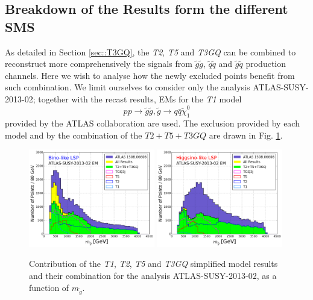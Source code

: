 \documentclass[a4paper,10pt]{article}
\newcommand{\MGLU}{$ m _{ \tilde g } $\xspace}
\begin{document}
\subsection{Breakdown of the Results form the different SMS}
As detailed in Section \ref{sec::T3GQ}, the \textit{T2}, \textit{T5} and \textit{T3GQ} can be combined to reconstruct more comprehensively the signals from $\tilde g \tilde g$, $\tilde q \tilde q$ and $\tilde g \tilde q$ production channels. Here we wish to analyse how the newly excluded points benefit from such combination. We limit ourselves to consider only the analysis ATLAS-SUSY-2013-02; together with the recast results, EMs for the \textit{T1} model 
\begin{equation}
p p \rightarrow \tilde g \tilde g , \tilde g \rightarrow q \bar q \tilde \chi_1 ^0
\end{equation}
provided by the ATLAS collaboration are used. The exclusion provided by each model and by the combination of the $T2+T5+T3GQ$ are drawn in Fig. \ref{combination_gluino}. 
%
\begin{figure}[!]
\begin{center}
\subfigure
\includegraphics[width=0.49\textwidth]{PLOTS/Combination/BINO_Txnames_Contribution_ATLAS02_Gluino.png}
\subfigure
\includegraphics[width=0.49\textwidth]{PLOTS/Combination/HIGGSINO_Txnames_Contribution_ATLAS02_Gluino.png}
\end{center}
\caption{Contribution of the \textit{T1}, \textit{T2}, \textit{T5} and \textit{T3GQ} simplified model results and their combination for the analysis ATLAS-SUSY-2013-02, as a function of \MGLU.} 
\label{combination_gluino}
\end{figure}
\end{document}
